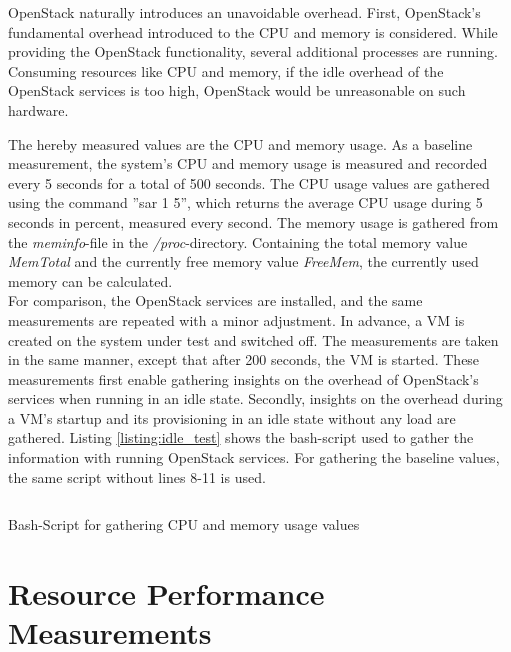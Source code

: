         OpenStack naturally introduces an unavoidable overhead.
        First, OpenStack's fundamental overhead introduced to the \ac{CPU} and memory is considered.
        While providing the OpenStack functionality, several additional processes are running.
        Consuming resources like \ac{CPU} and memory, if the idle overhead of the OpenStack services is too high, OpenStack would be unreasonable on such hardware.
        
        \noindent The hereby measured values are the \ac{CPU} and memory usage.
        As a baseline measurement, the system's \ac{CPU} and memory usage is measured and recorded every 5 seconds for a total of 500 seconds.
        The CPU usage values are gathered using the command ”sar 1 5”, which returns the average CPU usage during 5 seconds in percent, measured every second. 
        The memory usage is gathered from the \textsl{meminfo}-file in the \textsl{/proc}-directory.
        Containing the total memory value \textsl{MemTotal} and the currently free memory value \textsl{FreeMem}, the currently used memory can be calculated.\\
        For comparison, the OpenStack services are installed, and the same measurements are repeated with a minor adjustment.
        In advance, a \ac{VM} is created on the system under test and switched off.
        The measurements are taken in the same manner, except that after 200 seconds, the \ac{VM} is started.
        These measurements first enable gathering insights on the overhead of OpenStack’s services when running in an idle state. 
        Secondly, insights on the overhead during a VM's startup and its provisioning in an idle state without any load are gathered.
        Listing \ref{listing:idle_test} shows the bash-script used to gather the information with running OpenStack services.
        For gathering the baseline values, the same script without lines 8-11 is used.

        \begin{listing}[ht]
            \inputminted[frame=single, linenos, breaklines]{bash}{measurements/00_install-execute/04_startup.sh}
            \caption{Bash-Script for gathering CPU and memory usage values}
            \label{listing:idle_test}
        \end{listing}

    
    \section{Resource Performance Measurements}
    \label{subsection:methodology_impact}
        
